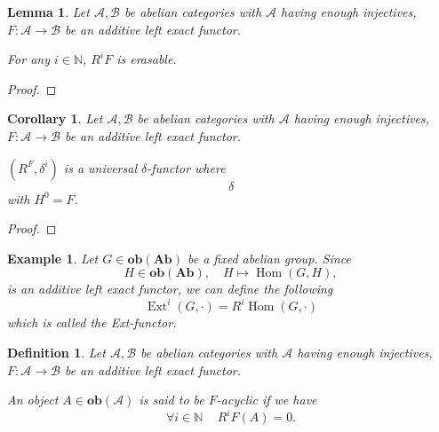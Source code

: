 \documentclass{article}
\newtheorem{definition}{Definition}[section]
\newtheorem{lemma}{Lemma}[section]
\newtheorem{corollary}{Corollary}[section]
\newtheorem{example}{Example}[section]
\numberwithin{equation}{section}
\DeclareMathOperator{\Hom}{Hom}
\DeclareMathOperator{\Ext}{Ext}
\begin{document}
\begin{lemma}
Let $\mathscr{A},\mathscr{B}$ be abelian categories with $\mathscr{A}$ having enough injectives, $F:\mathscr{A}\to\mathscr{B}$ be an additive left exact functor. \\
\par For any $i\in\mathbb{N}$, $R^iF$ is erasable.%
\end{lemma}

\begin{proof}
\end{proof}

\begin{corollary}
Let $\mathscr{A},\mathscr{B}$ be abelian categories with $\mathscr{A}$ having enough injectives, $F:\mathscr{A}\to\mathscr{B}$ be an additive left exact functor. \\
\par $(R^F,\delta^i)$ is a universal $\delta$-functor where
\begin{equation*}
\delta %
\end{equation*}
with $H^0=F$.
\end{corollary}

\begin{proof}
\end{proof}

\begin{example}
Let $G\in\mathbf{ob}(\mathbf{Ab})$ be a fixed abelian group. Since
\begin{equation*}
H\in\mathbf{ob}(\mathbf{Ab}), \quad H\mapsto \Hom(G,H),
\end{equation*}
is an additive left exact functor, we can define the following
\begin{equation*}
\Ext^i(G,\cdot) = R^i\Hom(G,\cdot)
\end{equation*}
which is called the Ext-functor.
\end{example}

\begin{definition}
Let $\mathscr{A},\mathscr{B}$ be abelian categories with $\mathscr{A}$ having enough injectives, $F:\mathscr{A}\to\mathscr{B}$ be an additive left exact functor. \\ %
\par An object $A\in\mathbf{ob}(\mathscr{A})$ is said to be $F$-acyclic if we have
\begin{equation*}
\forall i\in\mathbb{N}\,\quad R^iF(A) = 0.
\end{equation*}
\end{definition}
\end{document}
